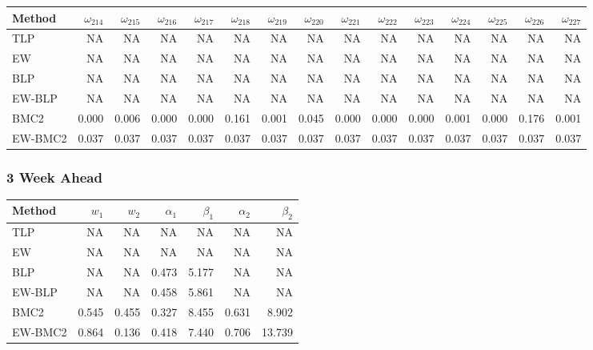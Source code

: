 \documentclass[
]{article}
\begin{document}
\begin{tabular}{lrrrrrrrrrrrrrr}
\toprule
Method & $\omega_{214}$ & $\omega_{215}$ & $\omega_{216}$ & $\omega_{217}$ & $\omega_{218}$ & $\omega_{219}$ & $\omega_{220}$ & $\omega_{221}$ & $\omega_{222}$ & $\omega_{223}$ & $\omega_{224}$ & $\omega_{225}$ & $\omega_{226}$ & $\omega_{227}$\\
\midrule
TLP & NA & NA & NA & NA & NA & NA & NA & NA & NA & NA & NA & NA & NA & NA\\
EW & NA & NA & NA & NA & NA & NA & NA & NA & NA & NA & NA & NA & NA & NA\\
BLP & NA & NA & NA & NA & NA & NA & NA & NA & NA & NA & NA & NA & NA & NA\\
EW-BLP & NA & NA & NA & NA & NA & NA & NA & NA & NA & NA & NA & NA & NA & NA\\
BMC2 & 0.000 & 0.006 & 0.000 & 0.000 & 0.161 & 0.001 & 0.045 & 0.000 & 0.000 & 0.000 & 0.001 & 0.000 & 0.176 & 0.001\\
EW-BMC2 & 0.037 & 0.037 & 0.037 & 0.037 & 0.037 & 0.037 & 0.037 & 0.037 & 0.037 & 0.037 & 0.037 & 0.037 & 0.037 & 0.037\\
\bottomrule
\end{tabular}

\hypertarget{week-ahead-18}{%
\subsubsection{3 Week Ahead}\label{week-ahead-18}}

\begin{tabular}{lrrrrrr}
\toprule
Method & $w_1$ & $w_2$ & $\alpha_1$ & $\beta_1$ & $\alpha_2$ & $\beta_2$\\
\midrule
TLP & NA & NA & NA & NA & NA & NA\\
EW & NA & NA & NA & NA & NA & NA\\
BLP & NA & NA & 0.473 & 5.177 & NA & NA\\
EW-BLP & NA & NA & 0.458 & 5.861 & NA & NA\\
BMC2 & 0.545 & 0.455 & 0.327 & 8.455 & 0.631 & 8.902\\
EW-BMC2 & 0.864 & 0.136 & 0.418 & 7.440 & 0.706 & 13.739\\
\bottomrule
\end{tabular}
\end{document}
